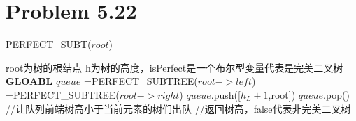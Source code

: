 \documentclass[twocolumn]{ctexart}
\begin{document}
\section*{Problem 5.22}



\begin{algorithm}
	\caption{PERFECT\_SUBT($root$)}
	\label{MAX_PERFECT_SUBTREE}
	\begin{algorithmic}[1]
	\REQUIRE root为树的根结点
	\ENSURE [h,isPerfect] h为树的高度，isPerfect是一个布尔型变量代表是完美二叉树
	\STATE \textbf{GLOABL} $queue$
			\RETURN [0,$true$]
	\ENDIF
		\STATE[$h_L$,$isPerfect_L$]=PERFECT\_SUBTREE($root->left$)
		\STATE [$h_R$,$isPerfect_R$]=PERFECT\_SUBTREE($root->right$)
			\STATE $queue$.push([$h_L+1$,root])
				\STATE $queue$.pop()
				\STATE //让队列前端树高小于当前元素的树们出队
			\ENDWHILE
			\RETURN [$h_L+1$,$true$]
	\ELSE
			\STATE //返回树高，false代表非完美二叉树
	\ENDIF
	\end{algorithmic}
\end{algorithm}
\end{document}
